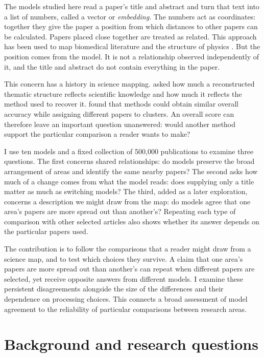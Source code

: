\documentclass[12pt]{article}
\begin{document}
The models studied here read a paper's title and abstract and turn that text into a list of numbers, called a vector or \emph{embedding}. The numbers act as coordinates: together they give the paper a position from which distances to other papers can be calculated. Papers placed close together are treated as related. This approach has been used to map biomedical literature and the structure of physics \citep{refbe130e2973,refc0e2cc29e0}. But the position comes from the model. It is not a relationship observed independently of it, and the title and abstract do not contain everything in the paper.

This concern has a history in science mapping. \citet{refa0d2d707e6} asked how much a reconstructed thematic structure reflects scientific knowledge and how much it reflects the method used to recover it. \citet{ref6a2f5912bc} found that methods could obtain similar overall accuracy while assigning different papers to clusters. An overall score can therefore leave an important question unanswered: would another method support the particular comparison a reader wants to make?

I use ten models and a fixed collection of 500,000 publications to examine three questions. The first concerns shared relationships: do models preserve the broad arrangement of areas and identify the same nearby papers? The second asks how much of a change comes from what the model reads: does supplying only a title matter as much as switching models? The third, added as a later exploration, concerns a description we might draw from the map: do models agree that one area's papers are more spread out than another's? Repeating each type of comparison with other selected articles also shows whether its answer depends on the particular papers used.

The contribution is to follow the comparisons that a reader might draw from a science map, and to test which choices they survive. A claim that one area's papers are more spread out than another's can repeat when different papers are selected, yet receive opposite answers from different models. I examine these persistent disagreements alongside the size of the differences and their dependence on processing choices. This connects a broad assessment of model agreement to the reliability of particular comparisons between research areas.

\section{Background and research questions}
\end{document}
